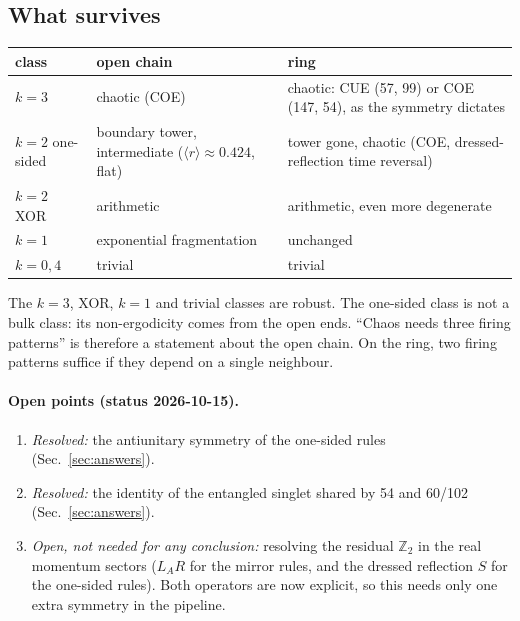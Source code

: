 \subsection{What survives}
\label{sec:open-pbc}
\begin{center}
\begin{tabular}{lp{}p{}}
\toprule
class & open chain & ring \\
\midrule
$k=3$ & chaotic (COE) & chaotic: CUE (57, 99) or COE (147, 54), as the symmetry dictates \\
$k=2$ one-sided & boundary tower, intermediate ($\langle r\rangle\approx0.424$, flat) & tower gone, chaotic (COE,
dressed-reflection time reversal) \\
$k=2$ XOR & arithmetic & arithmetic, even more degenerate \\
$k=1$ & exponential fragmentation & unchanged \\
$k=0,4$ & trivial & trivial \\
\bottomrule
\end{tabular}
\end{center}
The $k=3$, XOR, $k=1$ and trivial classes are robust. The one-sided class is not a bulk class: its non-ergodicity comes
from the open ends. ``Chaos needs three firing patterns'' is therefore a statement about the open chain. On the ring,
two firing patterns suffice if they depend on a single neighbour.

\paragraph{Open points (status 2026-10-15).}
\begin{enumerate}
\item \emph{Resolved:} the antiunitary symmetry of the one-sided rules (Sec.~\ref{sec:answers}).
\item \emph{Resolved:} the identity of the entangled singlet shared by 54 and 60/102 (Sec.~\ref{sec:answers}).
\item \emph{Open, not needed for any conclusion:} resolving the residual $\mathbb Z_2$ in the real momentum sectors
  ($L_AR$ for the mirror rules, and the dressed reflection $S$ for the one-sided rules). Both operators are now explicit,
  so this needs only one extra symmetry in the pipeline.
\end{enumerate}
